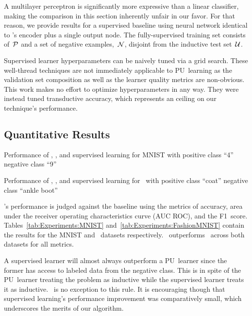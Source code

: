 A multilayer perceptron is significantly more expressive than a linear classifier, making the comparison in this section inherently unfair in our favor. For that reason, we provide results for a supervised baseline using neural network identical to \toolname's encoder plus a single output node.  The fully-supervised training set consists of~$\mathcal{P}$ and a set of negative examples,~$\mathcal{N}$, disjoint from the inductive test set~$\mathcal{U}$.

Supervised learner hyperparameters can be naively tuned via a grid search.  These well-thread techniques are not immediately applicable to PU~learning as the validation set composition as well as the learner quality metrics are non-obvious.  This work makes no effort to optimize hyperparameters in any way.  They were instead tuned transductive accuracy, which represents an ceiling on our technique's performance.

\subsection{Quantitative Results}

\begin{table}[t]
  \centering
  \caption{Performance of \toolname, \elkan, and supervised learning for MNIST with positive class ``4'' negative class ``9''}\label{tab:Experiments:MNIST}
  
\end{table}

\begin{table}[t]
  \centering
  \caption{Performance of \toolname, \elkan, and supervised learning for \fashmnist\ with positive class ``coat'' negative class ``ankle boot''}\label{tab:Experiments:FashionMNIST}
  
\end{table}

\toolname's performance is judged against the baseline using the metrics of accuracy, area under the receiver operating characteristics curve (AUC ROC), and the F1~score.  Tables~\ref{tab:Experiments:MNIST} and~\ref{tab:Experiments:FashionMNIST} contain the results for the MNIST and \fashmnist\ datasets respectively.  \toolname\ outperforms \elkan\ across both datasets for all metrics.

A supervised learner will almost always outperform a PU~learner since the former has access to labeled data from the negative class.  This is in spite of the PU~learner treating the problem as inductive while the supervised learner treats it as inductive.  \toolname\ is no exception to this rule.  It is encouraging though that supervised learning's performance improvement was comparatively small, which underscores the merits of our algorithm.

